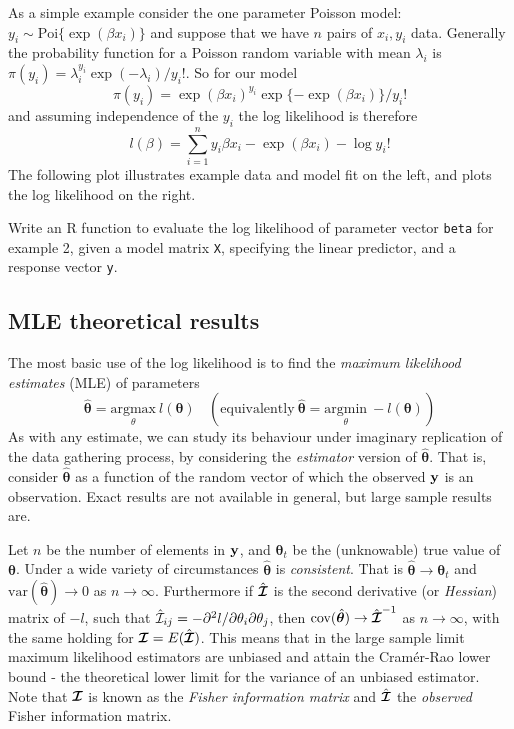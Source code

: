 \documentclass[10pt] {article}
\newcommand{\eps}[3]
{{\begin{center}
 \rotatebox{#1}{\scalebox{#2}{\texttt{[image: \#3]}}}
 \end{center}}
}
\newcommand{\ilpddif}[3]{\partial^2 #1/{\partial #2 \partial #3}}
\theoremstyle{definition}
\begin{document}
As a simple example consider the one parameter Poisson model:
$
y_i \sim \text{Poi}\{\exp(\beta x_i)\}
$ 
and suppose that we have $n$ pairs of $x_i, y_i$ data. Generally the probability function for a Poisson random variable with mean $\lambda_i$ is $\pi(y_i) = \lambda_i^{y_i} \exp(-\lambda_i)/y_i!$.  So for our model  
$$
\pi(y_i) = \exp(\beta x_i)^{y_i} \exp\{-\exp(\beta x_i)\}/y_i!
$$
and assuming independence of the $y_i$ the log likelihood is therefore
$$
l(\beta) = \sum_{i=1}^n y_i \beta x_i - \exp(\beta x_i) - \log y_i!
$$
The following plot illustrates example data and model fit on the left, and plots the log likelihood on the right. 
\eps{0}{.5}{fig-likelihood-fig-1.pdf}


\bigskip 

 Write an R function to evaluate the log likelihood of parameter vector {\tt beta} for example 2, given a model matrix {\tt X}, specifying the linear predictor, and a response vector {\tt y}.  

\subsection{MLE theoretical results}

The most basic use of the log likelihood is to find the {\em maximum likelihood estimates} (MLE) of parameters
$$
\hat {\bm \theta} = \underset{\theta}{\text{argmax}} ~l({\bm \theta}) ~~~~ (\text{equivalently}~\hat {\bm \theta} = \underset{\theta}{\text{argmin}} ~ -l({\bm \theta}))
$$
As with any estimate, we can study its behaviour under imaginary replication of the data gathering process, by considering the {\em estimator} version of $\hat {\bm \theta}$. That is, consider $\hat {\bm \theta}$ as a function of the random vector of which the observed $\bf y$ is an observation. Exact results are not available in general, but large sample results are. 

Let $n$ be the number of elements in $\bf y$, and ${\bm \theta}_t$ be the (unknowable) true value of $\bm \theta$. Under a wide variety of circumstances $\hat {\bm \theta}$ is {\em consistent}. That is $\hat {\bm \theta} \to {\bm \theta}_t$ and $\text{var}(\hat {\bm \theta}) \to 0$ as $n \to \infty$. Furthermore if $\hat{\bm{{\cal I}}}$ is the second derivative (or {\em Hessian}) matrix of $-l$, such that $\hat {\cal I}_{ij} = - \ilpddif{l}{\theta_i}{\theta_j}$, then $ \text{cov} (\hat {\bm \theta})\to  \hat{\bm{{\cal I}}}^{-1} $ as $n \to \infty$, with the same holding for ${\bm{{\cal I}}} = E(\hat {\bm{{\cal I}}})$. This means that in the large sample limit maximum likelihood estimators are unbiased and attain the Cram\'er-Rao lower bound - the theoretical lower limit for the variance of an unbiased estimator.  Note that ${\bm{{\cal I}}}$ is known as the {\em Fisher information matrix} and   $\hat{\bm{{\cal I}}}$ the {\em observed} Fisher information matrix. 
\end{document}

